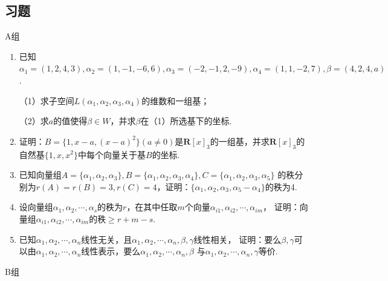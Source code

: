 \subsection{习题}
\centerline{\heiti A组}
\begin{enumerate}
	\item 已知$\alpha_1=(1,2,4,3),\alpha_2=(1,-1,-6,6),\alpha_3=(-2,-1,2,-9),\alpha_4=(1,1,-2,7),\beta=(4,2,4,a)$.
	
	（1）求子空间$L(\alpha_1,\alpha_2,\alpha_3,\alpha_4)$的维数和一组基；

	（2）求$a$的值使得$\beta\in W$，并求$\beta$在（1）所选基下的坐标.
	\item 证明：$B=\{1,x-a,(x-a)^2\}(a\neq 0)$是$\mathbf{R}[x]_3$的一组基，并求$\mathbf{R}[x]_3$的
	自然基$\{1,x,x^2\}$中每个向量关于基$B$的坐标.
	\item 已知向量组$A=\{\alpha_1,\alpha_2,\alpha_3\},B=\{\alpha_1,\alpha_2,\alpha_3,\alpha_4\},C=\{\alpha_1,\alpha_2,\alpha_3,\alpha_5\}$
	的秩分别为$r(A)=r(B)=3,r(C)=4$，证明：$\{\alpha_1,\alpha_2,\alpha_3,\alpha_5-\alpha_4\}$的秩为4.
	\item 设向量组$\alpha_1,\alpha_2,\cdots,\alpha_s$的秩为$r$，在其中任取$m$个向量$\alpha_{i1},\alpha_{i2},\cdots,\alpha_{im}$，
	证明：向量组$\alpha_{i1},\alpha_{i2},\cdots,\alpha_{im}$的秩$\ge r+m-s$.
	\item 已知$\alpha_1,\alpha_2,\cdots,\alpha_n$线性无关，且$\alpha_1,\alpha_2,\cdots,\alpha_n,\beta,\gamma$线性相关，
	证明：要么$\beta,\gamma$可以由$\alpha_1,\alpha_2,\cdots,\alpha_n$线性表示，要么$\alpha_1,\alpha_2,\cdots,\alpha_n,\beta$
	与$\alpha_1,\alpha_2,\cdots,\alpha_n,\gamma$等价.
\end{enumerate}
\centerline{\heiti B组}
